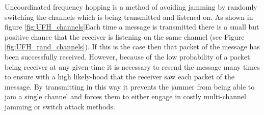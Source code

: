 \documentclass[sigconf]{acmart}
\begin{document}
Uncoordinated frequency hopping is a method of avoiding jamming by randomly switching the channels which is being transmitted and listened on. As shown in figure \ref{fig:UFH_channels}Each time a message is transmitted there is a small but positive chance that the receiver is listening on the same channel (see Figure \ref{fig:UFH_rand_channels}). If this is the case then that packet of the message has been successfully received. However, because of the low probability of a packet being receiver at any given time it is necessary to resend the message many times to ensure with a high likely-hood that the receiver saw each packet of the message. By transmitting in this way it prevents the jammer from being able to jam a single channel and forces them to either engage in costly multi-channel jamming or switch attack methods. 
\end{document}
